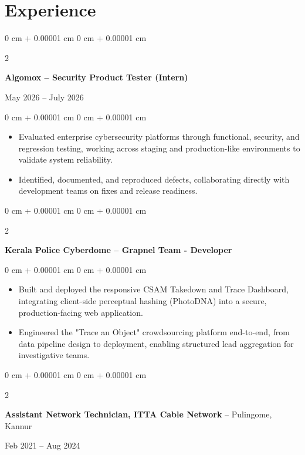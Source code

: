 \documentclass[10pt, a4paper]{article}
\newenvironment{highlights}{
    \begin{itemize}[
        topsep=0.10 cm,
        parsep=0.10 cm,
        partopsep=0pt,
        itemsep=0pt,
        leftmargin=0 cm + 10pt
    ]
}{
    \end{itemize}
} %
\newenvironment{onecolentry}{
    \begin{adjustwidth}{
        0 cm + 0.00001 cm
    }{
        0 cm + 0.00001 cm
    }
}{
    \end{adjustwidth}
} %
\newenvironment{twocolentry}[2][]{
    \onecolentry
    \def\secondColumn{#2}
    \setcolumnwidth{\fill, 4.5 cm}
    \begin{paracol}{2}
}{
    \switchcolumn \raggedleft \secondColumn
    \end{paracol}
    \endonecolentry
} %
\begin{document}
    \section{Experience}

    \vspace{0.2 cm}

\begin{twocolentry}{
    May 2026 – July 2026
}
    \textbf{Algomox – Security Product Tester (Intern)}
\end{twocolentry}

\vspace{0.10 cm}
\begin{onecolentry}
    \begin{highlights}
        \item Evaluated enterprise cybersecurity platforms through functional, security, and regression testing, working across staging and production-like environments to validate system reliability.
        \item Identified, documented, and reproduced defects, collaborating directly with development teams on fixes and release readiness.
    \end{highlights}
\end{onecolentry}

\vspace{0.2 cm}

\begin{twocolentry}{
}
    \textbf{Kerala Police Cyberdome – Grapnel Team - Developer}
\end{twocolentry}

\vspace{0.10 cm}
\begin{onecolentry}
    \begin{highlights}
        \item Built and deployed the responsive CSAM Takedown and Trace Dashboard, integrating client-side perceptual hashing (PhotoDNA) into a secure, production-facing web application.
        \item Engineered the "Trace an Object" crowdsourcing platform end-to-end, from data pipeline design to deployment, enabling structured lead aggregation for investigative teams.
    \end{highlights}
\end{onecolentry}

    \vspace{0.2 cm}

\begin{twocolentry}{
    Feb 2021 – Aug 2024
}
    \textbf{Assistant Network Technician, ITTA Cable Network} -- Pulingome, Kannur
\end{twocolentry}
\end{document}
